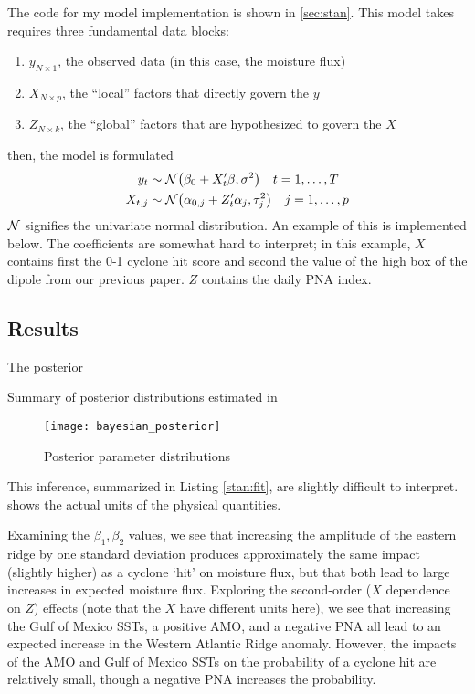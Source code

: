 \documentclass[12pt]{article}
\begin{document}
The \stan code for my model implementation is shown in \cref{sec:stan}.
This model takes requires three fundamental data blocks:
\begin{enumerate}
    \item $y_{N \times 1}$, the observed data (in this case, the moisture flux)
    \item $X_{N \times p}$, the ``local'' factors that directly govern the $y$
    \item $Z_{N \times k}$, the ``global'' factors that are hypothesized to govern the $X$
\end{enumerate}
then, the model is formulated
\begin{align}
    y_t & \sim \mathcal{N} \qty(\beta_0 + X'_t \beta, \sigma^2) \quad t = 1, \ldots, T \label{eq:yX}\\
    X_{t,j} &\sim \mathcal{N} \qty(\alpha_{0,j} + Z'_t \alpha_j, \tau_j^2) \quad j = 1, \ldots, p \label{eq:XZ}
\end{align}
$\mathcal{N}$ signifies the univariate normal distribution.
An example of this is implemented below.
The coefficients are somewhat hard to interpret; in this example, $X$ contains first the 0-1 cyclone hit score and second the value of the high box of the dipole from our previous paper.
$Z$ contains the daily PNA index.

\subsection{Results}

The posterior
\begin{lstfloat}
    
    \caption{Summary of posterior distributions estimated in \stan  \label{stan:fit}}
\end{lstfloat}
\begin{figure}
    \centering
    \texttt{[image: bayesian\_posterior]}
    \caption{Posterior parameter distributions}
    \label{label:stan-plot}
\end{figure}


This inference, summarized in Listing \ref{stan:fit}, are slightly difficult to interpret.
 shows the actual units of the physical quantities.

Examining the $\beta_1,\beta_2$ values, we see that increasing the amplitude of the eastern ridge by one standard deviation produces approximately the same impact (slightly higher) as a cyclone `hit' on moisture flux, but that both lead to large increases in expected moisture flux.
Exploring the second-order ($X$ dependence on $Z$) effects (note that the $X$ have different units here), we see that increasing the Gulf of Mexico SSTs, a positive AMO, and a negative PNA all lead to an expected increase in the Western Atlantic Ridge anomaly.
However, the impacts of the AMO and Gulf of Mexico SSTs on the probability of a cyclone hit are relatively small, though a negative PNA increases the probability.
\end{document}
